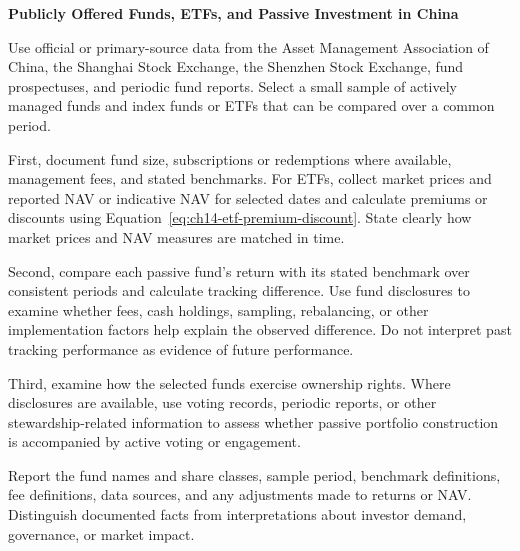 

\textbf{Publicly Offered Funds, ETFs, and Passive Investment in China}

Use official or primary-source data from the Asset Management Association of China, the Shanghai Stock Exchange, the Shenzhen Stock Exchange, fund prospectuses, and periodic fund reports. Select a small sample of actively managed funds and index funds or ETFs that can be compared over a common period.

First, document fund size, subscriptions or redemptions where available, management fees, and stated benchmarks. For ETFs, collect market prices and reported NAV or indicative NAV for selected dates and calculate premiums or discounts using Equation~\ref{eq:ch14-etf-premium-discount}. State clearly how market prices and NAV measures are matched in time.

Second, compare each passive fund's return with its stated benchmark over consistent periods and calculate tracking difference. Use fund disclosures to examine whether fees, cash holdings, sampling, rebalancing, or other implementation factors help explain the observed difference. Do not interpret past tracking performance as evidence of future performance.

Third, examine how the selected funds exercise ownership rights. Where disclosures are available, use voting records, periodic reports, or other stewardship-related information to assess whether passive portfolio construction is accompanied by active voting or engagement.

Report the fund names and share classes, sample period, benchmark definitions, fee definitions, data sources, and any adjustments made to returns or NAV. Distinguish documented facts from interpretations about investor demand, governance, or market impact.



